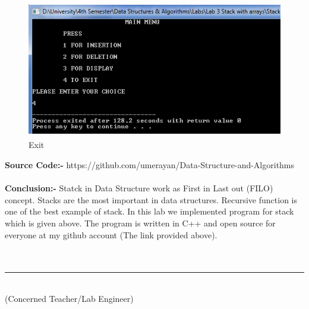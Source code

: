 \documentclass[11pt]{article}            %
\newcommand\tab[1][1cm]{\hspace*{#1}}
\begin{document}
\begin{figure}[H]
\centering
  \includegraphics[width=12cm,height=6cm,keepaspectratio]{5.png}
\caption{Exit}
\label{Figure:7}    
\end{figure}

\textbf{Source Code:-}
https://github.com/umerayan/Data-Structure-and-Algorithms\\~\\

\textbf{Conclusion:-}
Statck in Data Structure work as First in Last out (FILO) concept. Stacks are the most important in data structures. Recursive function is one of the best example of stack. In this lab we implemented program for stack which is given above.
The program is written in C++ and open source for everyone at my github account (The link provided above).\\~\\~\\

\tab[6cm] \noindent\rule{6cm}{0.4pt}\\
\tab[6cm] (Concerned Teacher/Lab Engineer)
 
\end{document}
